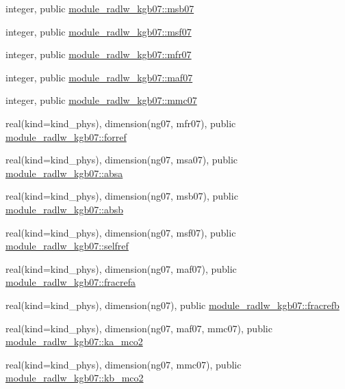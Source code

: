 \begin{DoxyCompactItemize}
\item 
integer, public \hyperlink{group__module__radlw__main_gabba2139dfc5d8551f844f3809c28ce3c}{module\+\_\+radlw\+\_\+kgb07\+::msb07}
\item 
integer, public \hyperlink{group__module__radlw__main_ga9310f33501467fbadcf092d71559358b}{module\+\_\+radlw\+\_\+kgb07\+::msf07}
\item 
integer, public \hyperlink{group__module__radlw__main_ga0bd5d550553238ae13cbf57423d102c8}{module\+\_\+radlw\+\_\+kgb07\+::mfr07}
\item 
integer, public \hyperlink{group__module__radlw__main_ga21ac454fe21fb07ee555b4106121b2ae}{module\+\_\+radlw\+\_\+kgb07\+::maf07}
\item 
integer, public \hyperlink{group__module__radlw__main_ga2d176bec938d9fdcc2369fda91308702}{module\+\_\+radlw\+\_\+kgb07\+::mmc07}
\item 
real(kind=kind\+\_\+phys), dimension(ng07, mfr07), public \hyperlink{group__module__radlw__main_ga43ceef4cb2707a2874c2d59e93ba9791}{module\+\_\+radlw\+\_\+kgb07\+::forref}
\item 
real(kind=kind\+\_\+phys), dimension(ng07, msa07), public \hyperlink{group__module__radlw__main_gaf106cf054f7496a092ceb0c399753a36}{module\+\_\+radlw\+\_\+kgb07\+::absa}
\item 
real(kind=kind\+\_\+phys), dimension(ng07, msb07), public \hyperlink{group__module__radlw__main_gab0478438e9bbe64401aa492510f8d4bb}{module\+\_\+radlw\+\_\+kgb07\+::absb}
\item 
real(kind=kind\+\_\+phys), dimension(ng07, msf07), public \hyperlink{group__module__radlw__main_gaaf6d41f390a0465af92756b9c3e6c558}{module\+\_\+radlw\+\_\+kgb07\+::selfref}
\item 
real(kind=kind\+\_\+phys), dimension(ng07, maf07), public \hyperlink{group__module__radlw__main_ga07f2a4a0f1152a65aed68623f14a9ae4}{module\+\_\+radlw\+\_\+kgb07\+::fracrefa}
\item 
real(kind=kind\+\_\+phys), dimension(ng07), public \hyperlink{group__module__radlw__main_gaa16eb60406e5a298e380b55af528791a}{module\+\_\+radlw\+\_\+kgb07\+::fracrefb}
\item 
real(kind=kind\+\_\+phys), dimension(ng07, maf07, mmc07), public \hyperlink{group__module__radlw__main_ga3fdad494f3d3fcf9306da6a81d97bd43}{module\+\_\+radlw\+\_\+kgb07\+::ka\+\_\+mco2}
\item 
real(kind=kind\+\_\+phys), dimension(ng07, mmc07), public \hyperlink{group__module__radlw__main_ga2dcfbe76332d559cda48c7ba065ab349}{module\+\_\+radlw\+\_\+kgb07\+::kb\+\_\+mco2}

\end{DoxyCompactItemize}
